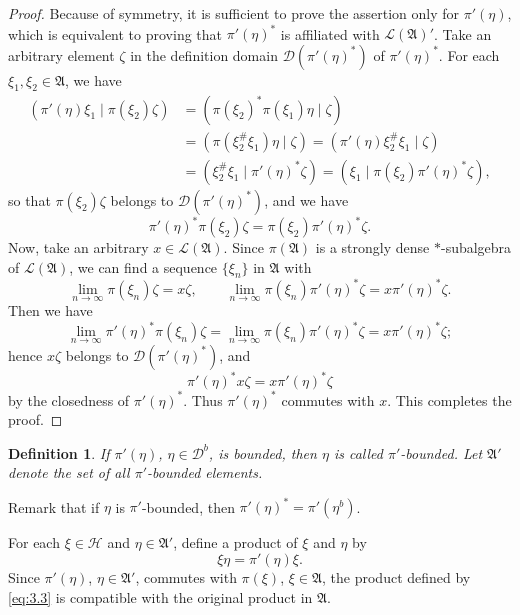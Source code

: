 \documentclass[12pt,b5paper,twoside]{article}
\theoremstyle{takesaki}
\newtheorem{definition}{Definition}[section]
\numberwithin{equation}{section}
\begin{document}
\begin{proof}
Because of symmetry, it is sufficient to prove the assertion only for
$\pi'(\eta)$, which is equivalent to proving that $\pi'(\eta)^*$ is
affiliated with $\mathcal L(\mathfrak A)'$.  Take an arbitrary element
$\zeta$ in the definition domain $\mathcal D(\pi'(\eta)^*)$ of
$\pi'(\eta)^*$.  For each $\xi_1,\xi_2\in\mathfrak A$, we have
\begin{align*}
  (\pi'(\eta)\xi_1\mid\pi(\xi_2)\zeta)
    &=(\pi(\xi_2)^*\pi(\xi_1)\eta\mid\zeta)\\
    &=(\pi(\xi_2^\#\xi_1)\eta\mid\zeta)
      =(\pi'(\eta)\xi_2^\#\xi_1\mid\zeta)\\
    &=(\xi_2^\#\xi_1\mid\pi'(\eta)^*\zeta)
      =(\xi_1\mid\pi(\xi_2)\pi'(\eta)^*\zeta),
\end{align*}
so that $\pi(\xi_2)\zeta$ belongs to
$\mathcal D(\pi'(\eta)^*)$, and we have
\[
  \pi'(\eta)^*\pi(\xi_2)\zeta
   =\pi(\xi_2)\pi'(\eta)^*\zeta.
\]
Now, take an arbitrary $x\in\mathcal L(\mathfrak A)$.  Since
$\pi(\mathfrak A)$ is a strongly dense $*$-subalgebra of
$\mathcal L(\mathfrak A)$, we can find a sequence $\{\xi_n\}$ in
$\mathfrak A$ with
\[
  \lim_{n\to\infty}\pi(\xi_n)\zeta=x\zeta,
  \qquad
  \lim_{n\to\infty}\pi(\xi_n)\pi'(\eta)^*\zeta
      =x\pi'(\eta)^*\zeta.
\]
Then we have
\[
  \lim_{n\to\infty}\pi'(\eta)^*\pi(\xi_n)\zeta
   =\lim_{n\to\infty}\pi(\xi_n)\pi'(\eta)^*\zeta
   =x\pi'(\eta)^*\zeta;
\]
hence $x\zeta$ belongs to $\mathcal D(\pi'(\eta)^*)$, and
\[
  \pi'(\eta)^*x\zeta=x\pi'(\eta)^*\zeta
\]
by the closedness of $\pi'(\eta)^*$.  Thus $\pi'(\eta)^*$ commutes with
$x$.  This completes the proof.
\end{proof}

\begin{definition}\label{def:3.1}
If $\pi'(\eta)$, $\eta\in\mathcal D^b$, is bounded, then $\eta$ is
called \emph{$\pi'$-bounded}.  Let $\mathfrak A'$ denote the set of all
$\pi'$-bounded elements.
\end{definition}

Remark that if $\eta$ is $\pi'$-bounded, then
$\pi'(\eta)^*=\pi'(\eta^b)$.

For each $\xi\in\mathcal H$ and $\eta\in\mathfrak A'$, define a product
of $\xi$ and $\eta$ by
\begin{equation}
  \xi\eta=\pi'(\eta)\xi.
  \tag{3.3}\label{eq:3.3}
\end{equation}
Since $\pi'(\eta)$, $\eta\in\mathfrak A'$, commutes with $\pi(\xi)$,
$\xi\in\mathfrak A$, the product defined by \eqref{eq:3.3} is compatible
with the original product in $\mathfrak A$.
\end{document}
